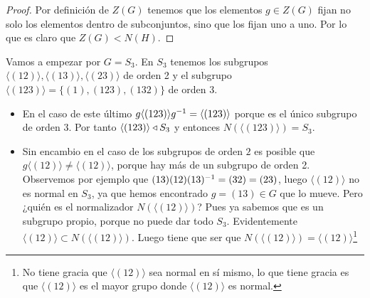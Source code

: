 \begin{proof}
	Por definición de $Z(G)$ tenemos que los elementos $g \in Z(G)$ fijan no solo los elementos dentro de subconjuntos, sino que los fijan uno a uno. Por lo que es claro que $Z(G) < N(H)$. 
\end{proof}

\begin{ej}
	Vamos a empezar por $G = S_3$. En $S_3$ tenemos los subgrupos $\langle (12) \rangle, \langle (13) \rangle, \langle (23) \rangle$ de orden 2 y el subgrupo $\langle (123) \rangle = \{(1), (123), (132)\}$ de orden 3. %
	\begin{itemize}
		\item En el caso de este último $g\langle (123) \rangle g^{-1} = \langle (123) \rangle$ porque es el único subgrupo de orden 3. Por tanto $\langle (123) \rangle \mathbin{\triangleleft} S_3$ y entonces $N(\langle (123) \rangle) = S_3$.
		\item Sin encambio en el caso de los subgrupos de orden $2$ es posible que $g\langle (12) \rangle \neq \langle (12) \rangle$, porque hay más de un subgrupo de orden 2. Observemos por ejemplo que $(13)(12)(13)^{-1} = (32) = (23)$, luego $\langle (12) \rangle$ no es normal en $S_3$, ya que hemos encontrado $g = (13) \in G$ que lo mueve. Pero ¿quién es el normalizador $N(\langle (12) \rangle)$? Pues ya sabemos que es un subgrupo propio, porque no puede dar todo $S_3$. Evidentemente $\langle (12) \rangle \subset N(\langle (12) \rangle)$. Luego tiene que ser que $N(\langle (12) \rangle) = \langle (12) \rangle$\footnote{No tiene gracia que $\langle (12) \rangle$ sea normal en sí mismo, lo que tiene gracia es que $\langle (12) \rangle$ es el mayor grupo donde $\langle (12) \rangle$ es normal.} 
	\end{itemize}
\end{ej}


